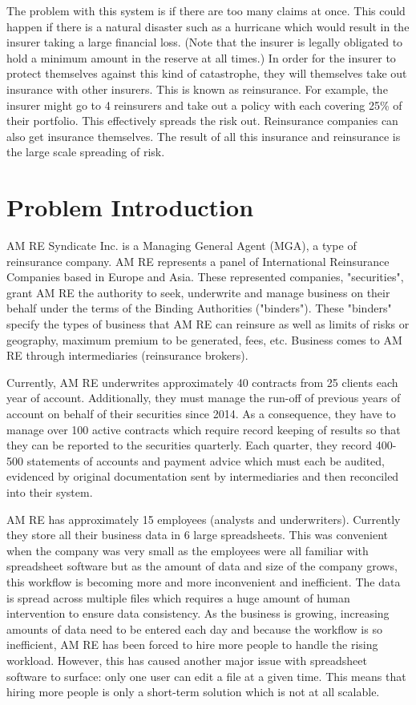 \documentclass[12pt]{article}
\begin{document}
The problem with this system is if there are too many claims at once. This could happen if there is a natural disaster such as a hurricane which would result in the insurer taking a large financial loss. (Note that the insurer is legally obligated to hold a minimum amount in the reserve at all times.) In order for the insurer to protect themselves against this kind of catastrophe, they will themselves take out insurance with other insurers. This is known as reinsurance. For example, the insurer might go to 4 reinsurers and take out a policy with each covering 25\% of their portfolio. This effectively spreads the risk out. Reinsurance companies can also get insurance themselves. The result of all this insurance and reinsurance is the large scale spreading of risk.


\section{Problem Introduction}
AM RE Syndicate Inc.\cite{amre} is a Managing General Agent (MGA), a type of reinsurance company. AM RE represents a panel of International Reinsurance Companies based in Europe and Asia. These represented companies, "securities", grant AM RE the authority to seek, underwrite and manage business on their behalf under the terms of the Binding Authorities ("binders"). These "binders" specify the types of business that AM RE can reinsure as well as limits of risks or geography, maximum premium to be generated, fees, etc. Business comes to AM RE through intermediaries (reinsurance brokers).

Currently, AM RE underwrites approximately 40 contracts from 25 clients each year of account. Additionally, they must manage the run-off of previous years of account on behalf of their securities since 2014. As a consequence, they have to manage over 100 active contracts which require record keeping of results so that they can be reported to the securities quarterly. Each quarter, they record 400-500 statements of accounts and payment advice which must each be audited, evidenced by original documentation sent by intermediaries and then reconciled into their system.

AM RE has approximately 15 employees (analysts and underwriters). Currently they store all their business data in 6 large spreadsheets. This was convenient when the company was very small as the employees were all familiar with spreadsheet software but as the
amount of data and size of the company grows, this workflow is becoming more and more
inconvenient and inefficient. The data is spread across multiple files which requires a huge amount of human intervention to ensure data consistency. As the business is growing, increasing amounts of data need to be entered each day and because the workflow is so inefficient, AM RE has been forced to hire more people to handle the rising workload. However, this has caused another major issue with spreadsheet software to surface: only one
user can edit a file at a given time. This means that hiring more people is only a short-term solution which is not at all scalable.
\end{document}
